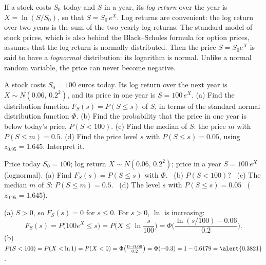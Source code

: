 
\begin{problem}
	\begin{context}
		If a stock costs $S_0$ today and $S$ in a year, its \emph{log return}
		over the year is $X=\ln(S/S_0)$, so that $S=S_0\,e^{X}$. Log returns are
		convenient: the log return over two years is the sum of the two yearly
		log returns. The standard model of stock prices, which is also behind the
		Black--Scholes formula for option prices, assumes that the log return is
		normally distributed. Then the price $S=S_0e^X$ is said to have a
		\emph{lognormal} distribution: its logarithm is normal. Unlike a normal
		random variable, the price can never become negative.
	\end{context}
	A stock costs $S_0=100$ euros today. Its log return over the next year is
	$X\sim N(0.06,\,0.2^2)$, and its price in one year is $S=100\,e^{X}$.
	(a) Find the distribution function $F_S(s)=P(S\le s)$ of $S$, in terms of
	the standard normal distribution function $\Phi$.
	(b) Find the probability that the price in one year is below today's
	price, $P(S<100)$.
	(c) Find the median of $S$: the price $m$ with $P(S\le m)=0.5$.
	(d) Find the price level $s$ with $P(S\le s)=0.05$, using
	$z_{0.95}=1.645$. Interpret it.
\end{problem}

\begin{slideproblem}
	Price today $S_0=100$; log return $X\sim N(0.06,\,0.2^2)$; price in a year
	$S=100\,e^{X}$ (lognormal).
	(a) Find $F_S(s)=P(S\le s)$ with $\Phi$.
	\ (b) $P(S<100)$?
	\ (c) The median $m$ of $S$: $P(S\le m)=0.5$.
	\ (d) The level $s$ with $P(S\le s)=0.05$ \ ($z_{0.95}=1.645$).
\end{slideproblem}

\begin{slides}
	\small
	\exstatement
	\pause
	\sol (a) $S>0$, so $F_S(s)=0$ for $s\le0$. For $s>0$, $\ln$ is
	increasing:
	\[ F_S(s)=P\big(100e^X\le s\big)=P\Big(X\le\ln\frac{s}{100}\Big)
		=\Phi\Big(\frac{\ln(s/100)-0.06}{0.2}\Big). \]
	\pause
	(b) $P(S<100)=P(X<\ln1)=P(X<0)=\Phi\big(\frac{0-0.06}{0.2}\big)
		=\Phi(-0.3)=1-0.6179=\alert{0.3821}$.
\end{slides}

